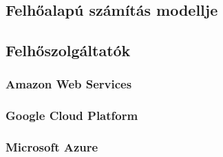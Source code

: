 \chapter{\clouds}
\section{Felhőalapú számítás modellje}
\section{Felhőszolgáltatók}
\subsection{Amazon Web Services}
\subsection{Google Cloud Platform}
\subsection{Microsoft Azure}